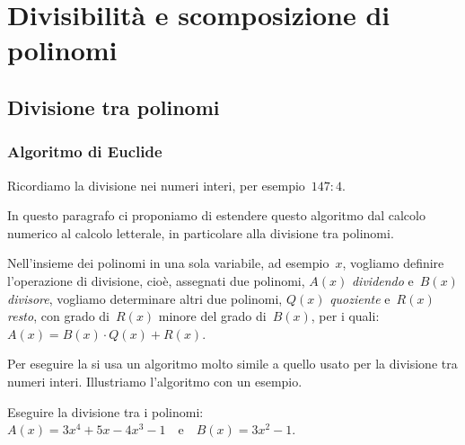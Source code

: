 


\chapter{Divisibilità e scomposizione di polinomi}

\section{Divisione tra polinomi}

\subsection{Algoritmo di Euclide}
\label{subsec:divpol_divisione_euclide}

Ricordiamo la divisione nei numeri interi, per esempio~\(147:4\). 


In questo paragrafo ci proponiamo di estendere questo algoritmo dal calcolo 
numerico al calcolo letterale, in particolare alla divisione tra polinomi.

Nell'insieme dei polinomi in una sola variabile, ad esempio~\(x\), vogliamo 
definire l'operazione di divisione, cioè, assegnati due polinomi, 
\(A(x)\) \emph{dividendo} e~\(B(x)\) \emph{divisore}, vogliamo determinare 
altri due polinomi, \(Q(x)\) \emph{quoziente} e~\(R(x)\) \emph{resto},
con grado di~\(R(x)\) minore del grado di~\(B(x)\), per i 
quali:~\(A(x) = B(x){\cdot}Q(x) + R(x)\).

Per eseguire la  si usa un 
algoritmo molto simile a quello usato per la divisione tra numeri interi. 
Illustriamo l'algoritmo con un esempio.

\begin{esempio}{}{}
Eseguire la divisione tra i polinomi: \\
\(A(x)=3x^4+5x-4x^3-1\)~~e~~\(B(x)=3x^2-1\).
\end{esempio}

